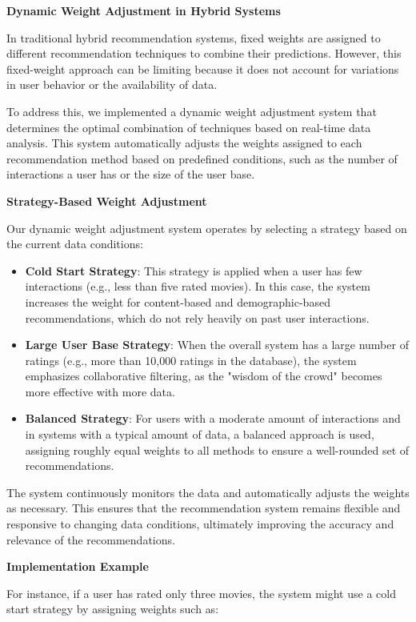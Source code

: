 \documentclass{article}
\begin{document}
\textbf{Dynamic Weight Adjustment in Hybrid Systems}

In traditional hybrid recommendation systems, fixed weights are assigned to different recommendation techniques to combine their predictions. However, this fixed-weight approach can be limiting because it does not account for variations in user behavior or the availability of data.

To address this, we implemented a dynamic weight adjustment system that determines the optimal combination of techniques based on real-time data analysis. This system automatically adjusts the weights assigned to each recommendation method based on predefined conditions, such as the number of interactions a user has or the size of the user base.

\textbf{Strategy-Based Weight Adjustment}

Our dynamic weight adjustment system operates by selecting a strategy based on the current data conditions:

\begin{itemize}
    \item \textbf{Cold Start Strategy}: This strategy is applied when a user has few interactions (e.g., less than five rated movies). In this case, the system increases the weight for content-based and demographic-based recommendations, which do not rely heavily on past user interactions.
    \item \textbf{Large User Base Strategy}: When the overall system has a large number of ratings (e.g., more than 10,000 ratings in the database), the system emphasizes collaborative filtering, as the "wisdom of the crowd" becomes more effective with more data.
    \item \textbf{Balanced Strategy}: For users with a moderate amount of interactions and in systems with a typical amount of data, a balanced approach is used, assigning roughly equal weights to all methods to ensure a well-rounded set of recommendations.
\end{itemize}

The system continuously monitors the data and automatically adjusts the weights as necessary. This ensures that the recommendation system remains flexible and responsive to changing data conditions, ultimately improving the accuracy and relevance of the recommendations.

\textbf{Implementation Example}

For instance, if a user has rated only three movies, the system might use a cold start strategy by assigning weights such as:
\end{document}
